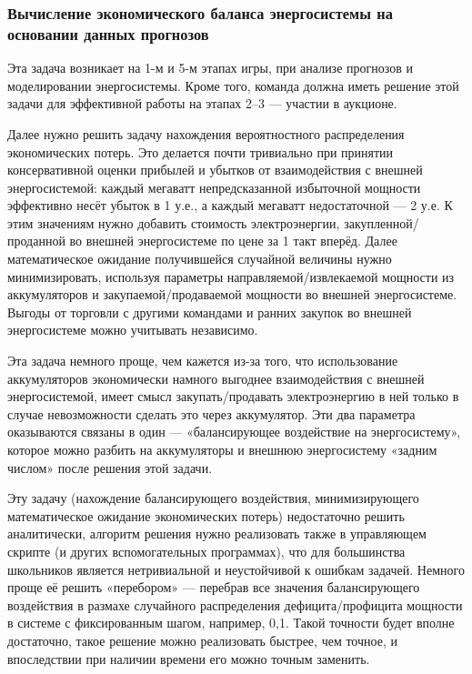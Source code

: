 \subsubsection*{Вычисление экономического баланса энергосистемы на основании данных прогнозов}

Эта задача возникает на 1-м и 5-м этапах игры, при анализе прогнозов и моделировании энергосистемы. Кроме того, команда должна иметь решение этой задачи для эффективной работы на этапах 2–3 — участии в аукционе.

Далее нужно решить задачу нахождения вероятностного распределения экономических потерь. Это делается почти тривиально при принятии консервативной оценки прибылей и убытков от взаимодействия с внешней энергосистемой: каждый мегаватт непредсказанной избыточной мощности эффективно несёт убыток в 1 у.е., а каждый мегаватт недостаточной — 2 у.е. К этим значениям нужно добавить стоимость электроэнергии, закупленной/проданной во внешней энергосистеме по цене за 1 такт вперёд. Далее математическое ожидание получившейся случайной величины нужно минимизировать, используя параметры направляемой/извлекаемой мощности из аккумуляторов и закупаемой/продаваемой мощности во внешней энергосистеме. Выгоды от торговли с другими командами и ранних закупок во внешней энергосистеме можно учитывать независимо.

Эта задача немного проще, чем кажется из-за того, что использование аккумуляторов экономически намного выгоднее взаимодействия с внешней энергосистемой, имеет смысл закупать/продавать электроэнергию в ней только в случае невозможности сделать это через аккумулятор. Эти два параметра оказываются связаны в один — «балансирующее воздействие на энергосистему», которое можно разбить на аккумуляторы и внешнюю энергосистему «задним числом» после решения этой задачи.

Эту задачу (нахождение балансирующего воздействия, минимизирующего математическое ожидание экономических потерь) недостаточно решить аналитически, алгоритм решения нужно реализовать также в управляющем скрипте (и других вспомогательных программах), что для большинства школьников является нетривиальной и неустойчивой к ошибкам задачей. Немного проще её решить «перебором» — перебрав все значения балансирующего воздействия в размахе случайного распределения дефицита/профицита мощности в системе с фиксированным шагом, например, 0,1. Такой точности будет вполне достаточно, такое решение можно реализовать быстрее, чем точное, и впоследствии при наличии времени его можно точным заменить.

